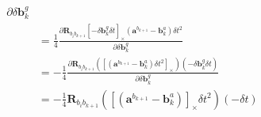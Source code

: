 \documentclass[12pt,a4paper,utf8]{article}
\begin{document}
\begin{landscape}
\begin{multicols}{2}
$$\begin{aligned}
{\partial \delta \mathbf{b}_{k}^{g}} \\
&=
\frac{1}{4} \frac{\partial 
\mathbf{R}_{b_{i} b_{k+1}}\left[-\delta \mathbf{b}_{k}^{g} \delta t\right]_{ \times}\left(\mathbf{a}^{b_{k+1}}-\mathbf{b}_{k}^{a}\right) \delta t^{2}}
{\partial \delta \mathbf{b}_{k}^{g}} \\
&=
-\frac{1}{4} \frac{\partial 
\mathbf{R}_{b_{i} b_{k+1}}\left(\left[\left(\mathbf{a}^{b_{k+1}}-\mathbf{b}_{k}^{a}\right) \delta t^{2}\right]_{ \times}\right)\left(-\delta \mathbf{b}_{k}^{g} \delta t\right)}
{\partial \delta \mathbf{b}_{k}^{g}} \\
&=
-\frac{1}{4} 
\mathbf{R}_{b_{i} b_{k+1}}\left(\left[\left(\mathbf{a}^{b_{k+1}}-\mathbf{b}_{k}^{a}\right) \right]_{\times}\delta t^{2}\right)\left(-\delta t\right)
\end{aligned}
$$


\end{multicols}
\end{landscape}
\end{document}
